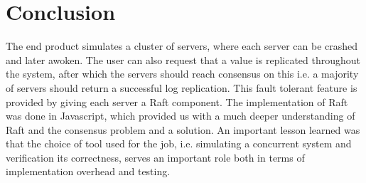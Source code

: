 \section{Conclusion} %
\label{sec:conclusion}
The end product simulates a cluster of servers, where each server can be crashed and later awoken. The user can also request that a value is replicated throughout the system, after which the servers should reach consensus on this i.e. a majority of servers should return a successful log replication. This fault tolerant feature is provided by giving each server a Raft component.
The implementation of Raft was done in Javascript, which provided us with a much deeper understanding of Raft and the consensus problem and a solution. An important lesson learned was that the choice of tool used for the job, i.e. simulating a concurrent system and verification its correctness, serves an important role both in terms of implementation overhead and testing.

